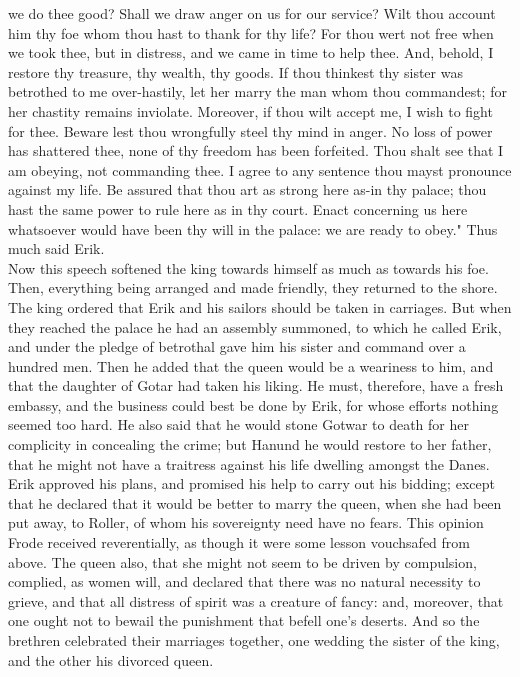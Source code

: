 \documentclass[10pt,a4paper]{report}
\begin{document}
we do thee good? Shall we draw anger on us for our service? Wilt thou account him thy foe whom thou hast to thank for thy life? For thou wert not free when we took thee, but in distress, and we came in time to help thee. And, behold, I restore thy treasure, thy wealth, thy goods. If thou thinkest thy sister was betrothed to me over-hastily, let her marry the man whom thou commandest; for her chastity remains inviolate. Moreover, if thou wilt accept me, I wish to fight for thee. Beware lest thou wrongfully steel thy mind in anger. No loss of power has shattered thee, none of thy freedom has been forfeited. Thou shalt see that I am obeying, not commanding thee. I agree to any sentence thou mayst pronounce against my life. Be assured that thou art as strong here as-in thy palace; thou hast the same power to rule here as in thy court. Enact concerning us here whatsoever would have been thy will in the palace: we are ready to obey." Thus much said Erik.\\

Now this speech softened the king towards himself as much as towards his foe. Then, everything being arranged and made friendly, they returned to the shore. The king ordered that Erik and his sailors should be taken in carriages. But when they reached the palace he had an assembly summoned, to which he called Erik, and under the pledge of betrothal gave him his sister and command over a hundred men. Then he added that the queen would be a weariness to him, and that the daughter of Gotar had taken his liking. He must, therefore, have a fresh embassy, and the business could best be done by Erik, for whose efforts nothing seemed too hard. He also said that he would stone Gotwar to death for her complicity in concealing the crime; but Hanund he would restore to her father, that he might not have a traitress against his life dwelling amongst the Danes. Erik approved his plans, and promised his help to carry out his bidding; except that he declared that it would be better to marry the queen, when she had been put away, to Roller, of whom his sovereignty need have no fears. This opinion Frode received reverentially, as though it were some lesson vouchsafed from above. The queen also, that she might not seem to be driven by compulsion, complied, as women will, and declared that there was no natural necessity to grieve, and that all distress of spirit was a creature of fancy: and, moreover, that one ought not to bewail the punishment that befell one's deserts. And so the brethren celebrated their marriages together, one wedding the sister of the king, and the other his divorced queen.\\
\end{document}
